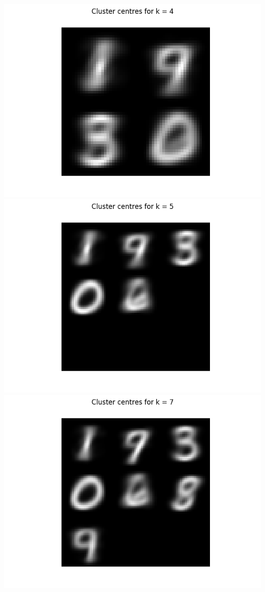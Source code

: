\documentclass{article}
\begin{document}
\begin{center}
\\
\includegraphics[trim=3cm 0 0 0, scale=0.4]{images/task1_6_imgs_4.png}
\includegraphics[trim=3cm 0 0 0, scale=0.4]{images/task1_6_imgs_5.png}
\includegraphics[trim=3cm 0 3cm 0, scale=0.4]{images/task1_6_imgs_7.png}

\end{center}
\end{document}
